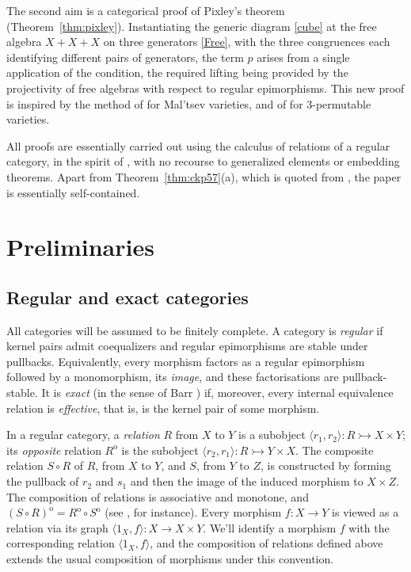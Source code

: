 \documentclass[11pt,a4paper]{article}
\theoremstyle{plain}
\theoremstyle{definition}
\theoremstyle{remark}
\theoremstyle{plain}
\newcommand{\op}{\mathrm{o}}
\begin{document}
The second aim is a categorical proof of Pixley's theorem
(Theorem~\ref{thm:pixley}). Instantiating the generic diagram \eqref{cube} at the free
algebra $X+X+X$ on three generators \eqref{Free}, with the three congruences each
identifying different pairs of generators, the term $p$ arises from a single
application of the condition, the required lifting being provided by the
projectivity of free algebras with respect to regular epimorphisms. This new
proof is inspired by the method of \cite{CP} for Mal'tsev varieties, and of \cite{GR} for $3$-permutable varieties.

All proofs are essentially carried out using the calculus of relations of a regular
category, in the spirit of \cite{CLP, CKP}, with no recourse to generalized
elements or embedding theorems. Apart from Theorem~\ref{thm:ckp57}(a),
which is quoted from \cite{CKP}, the paper is essentially self-contained. 

\section{Preliminaries}

\subsection{Regular and exact categories}

All categories will be assumed to be finitely complete. A category is
\emph{regular} if kernel pairs admit coequalizers and regular epimorphisms
are stable under pullbacks. Equivalently, every morphism factors as a regular epimorphism followed by a monomorphism,
its \emph{image}, and these factorisations are pullback-stable. It is \emph{exact} (in the sense of Barr \cite{Barr}) if,
moreover, every internal equivalence relation is \emph{effective}, that is,
is the kernel pair of some morphism.

In a regular category, a \emph{relation} $R$ from $X$ to $Y$ is a subobject
$\langle r_1, r_2\rangle\colon R \rightarrowtail X \times Y$; its
\emph{opposite} relation $R^{\op}$ is the subobject
$\langle r_2, r_1\rangle\colon R \rightarrowtail Y \times X$. The composite relation $S \circ R$
of $R$, from $X$ to $Y$, and $S$, from $Y$ to $Z$, is constructed by forming
the pullback of $r_2$ and $s_1$ and then the image of the induced morphism
to $X \times Z$. 
The composition of relations is associative and monotone, and
$(S \circ R)^{\op} = R^{\op} \circ S^{\op}$ (see
\cite[\S 2]{CKP}, for instance). 
Every morphism $f\colon X \to Y$ is
viewed as a relation via its graph $\langle 1_X, f\rangle \colon X \to X \times Y$. We'll identify a morphism $f$ with the corresponding relation $\langle 1_X, f\rangle$, and the composition of relations defined above extends the usual composition of morphisms under this convention.
\end{document}
